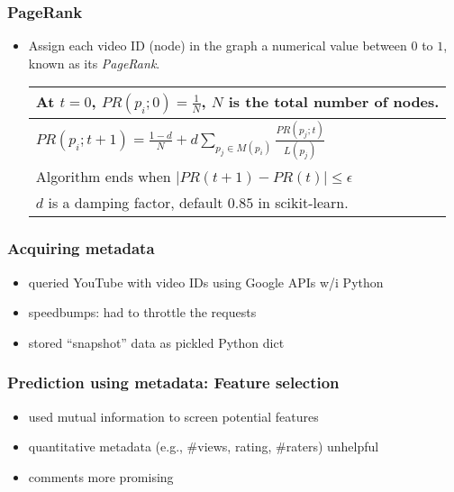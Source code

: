 \documentclass[fleqn]{beamer}
\begin{document}
\begin{frame}
\frametitle{PageRank}
      \begin{itemize}
         \item Assign each video ID (node) in the graph a numerical value
         between $0$ to $1$, known as its \textsl{PageRank}.
         \begin{center}
         \begin{tabular}{| l |}
         \hline
         At $t=0$, $PR(p_{i};0) = \frac{1}{N}$, $N$ is the total number of nodes. \\ \hline
         $PR(p_{i};t+1) = \frac{1-d}{N} + d \sum_{p_{j} \in M(p_{i})} \frac{PR(p_{j};t)}{L(p_{j})}$ \\ \hline
         Algorithm ends when $|PR(t+1) - PR(t)| \le \epsilon$ \\ \hline
         $d$ is a damping factor, default $0.85$ in scikit-learn. \\
         \hline
         \end{tabular}
         \end{center}
     \end{itemize}

\end{frame}

\begin{frame}
\frametitle{Acquiring metadata}
   \begin{itemize}
       \item queried YouTube with video IDs using Google APIs w/i Python
       \item speedbumps: had to throttle the requests
       \item stored ``snapshot'' data as pickled Python dict
   \end{itemize}
\end{frame}

\begin{frame}
\frametitle{Prediction using metadata: Feature selection}
      \begin{itemize}
          \item used mutual information to screen potential features
          \item quantitative metadata (e.g., \#views, rating, \#raters) unhelpful
          \item comments more promising
      \end{itemize}

\end{frame}
\end{document}

